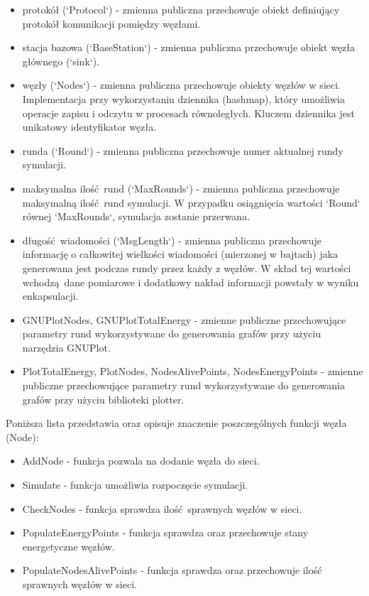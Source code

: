\documentclass[a4paper,12pt,twoside,openany]{report}
\begin{document}
\begin{itemize}
 \item protokół (`Protocol`) - zmienna publiczna przechowuje obiekt definiujący protokół komunikacji pomiędzy węzłami.
 \item stacja bazowa (`BaseStation`) - zmienna publiczna przechowuje obiekt węzła głównego (`sink`).
 \item węzły (`Nodes`) - zmienna publiczna przechowuje obiekty węzłów w sieci. Implementacja przy wykorzystaniu dziennika (hashmap), 
       który umożliwia operacje zapisu i odczytu w procesach równoległych. Kluczem dziennika jest unikatowy identyfikator węzła.
 \item runda (`Round`) - zmienna publiczna przechowuje numer aktualnej rundy symulacji.
 \item maksymalna ilość rund (`MaxRounds`) - zmienna publiczna przechowuje maksymalną ilość rund symulacji. 
       W przypadku osiągnięcia wartości `Round` równej `MaxRounds`, symulacja zostanie przerwana.
 \item długość wiadomości (`MsgLength`) - zmienna publiczna przechowuje informację o całkowitej wielkości wiadomości (mierzonej w bajtach) jaka generowana
       jest podczas rundy przez każdy z węzłów. W skład tej wartości wchodzą dane pomiarowe i dodatkowy nakład informacji powstały w wyniku enkapsulacji.
 \item GNUPlotNodes, GNUPlotTotalEnergy - zmienne publiczne przechowujące parametry rund wykorzystywane do generowania grafów przy użyciu narzędzia GNUPlot.
 \item PlotTotalEnergy, PlotNodes, NodesAlivePoints, NodesEnergyPoints - zmienne publiczne przechowujące parametry rund wykorzystywane do generowania grafów
       przy użyciu biblioteki plotter.
\end{itemize}

Poniższa lista przedstawia oraz opisuje znaczenie poszczególnych funkcji węzła (Node):

\begin{itemize}
 \item AddNode - funkcja pozwala na dodanie węzła do sieci.
 \item Simulate - funkcja umożliwia rozpoczęcie symulacji.
 \item CheckNodes - funkcja sprawdza ilość sprawnych węzłów w sieci.
 \item PopulateEnergyPoints - funkcja sprawdza oraz przechowuje stany energetyczne węzłów.
 \item PopulateNodesAlivePoints - funkcja sprawdza oraz przechowuje ilość sprawnych węzłów w sieci.
\end{itemize}
\end{document}
